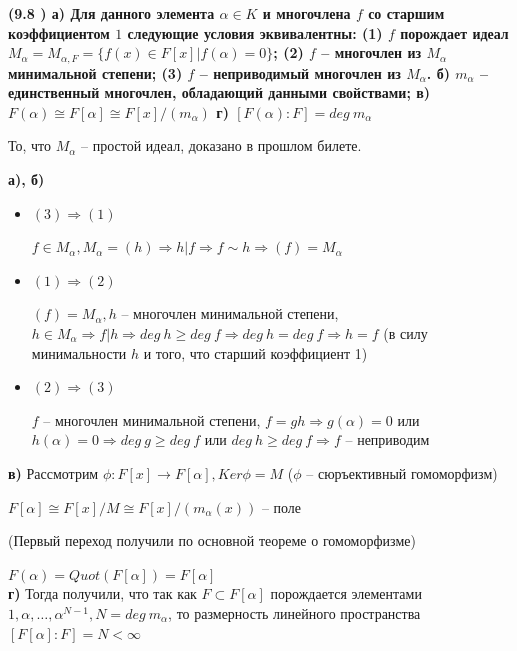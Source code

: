\textbf{(9.8 ) а) Для данного элемента $\alpha \in K$ и многочлена $f$ со старшим коэффициентом $1$ следующие
условия эквивалентны:
(1) $f$ порождает идеал $M_{\alpha} = M_{\alpha,F} = \{f(x) \in F[x] | f(\alpha) = 0\}$;
(2) $f$ -- многочлен из $M_{\alpha}$ минимальной степени;
(3) $f$ -- неприводимый многочлен из $M_{\alpha}$.
б) $m_{\alpha}$ -- единственный многочлен, обладающий данными свойствами;
в)  $F(\alpha) \cong F[\alpha] \cong F[x]/(m_{\alpha})$
г) $[F(\alpha) : F] = deg \ m_{\alpha}$}

То, что $M_{\alpha}$ -- простой идеал, доказано в прошлом билете.

\textbf{а), б)}

\begin{itemize}
    \item \textbf{$(3) \Rightarrow (1)$}
    
    $f \in M_{\alpha}, M_{\alpha} = (h) \Rightarrow h|f \Rightarrow f \sim h \Rightarrow (f) = M_{\alpha}$
    
    \item \textbf{$(1) \Rightarrow (2)$}
    
    $(f) = M_{\alpha}, h$ -- многочлен минимальной степени, $h \in M_{\alpha} \Rightarrow f|h \Rightarrow deg \ h \geq deg \ f \Rightarrow deg \ h = deg \ f \Rightarrow h = f$ (в силу минимальности $h$ и того, что старший коэффициент 1)
    
    \item \textbf{$(2) \Rightarrow (3)$}
    
    $f$ --  многочлен минимальной степени, $f = gh \Rightarrow g(\alpha) = 0$ или $h(\alpha) = 0 \Rightarrow deg \ g \geq deg \ f$ или $deg \ h \geq deg \ f \Rightarrow f$ -- неприводим
\end{itemize}

\textbf{в)}
Рассмотрим $\phi: F[x] \to F[\alpha], Ker \phi = M$ ($\phi$ -- сюръективный гомоморфизм)

$F[\alpha] \cong F[x]/M \cong F[x]/(m_{\alpha}(x))$ -- поле

(Первый переход получили по основной теореме о гомоморфизме)

$F(\alpha) = Quot(F[\alpha]) = F[\alpha]$\\

\textbf{г)}
Тогда получили, что так как $F \subset F[\alpha]$ порождается элементами $1, \alpha, \ldots, \alpha^{N-1}, N = deg \ m_{\alpha}$, то размерность линейного пространства $[F[\alpha] : F] = N < \infty$
